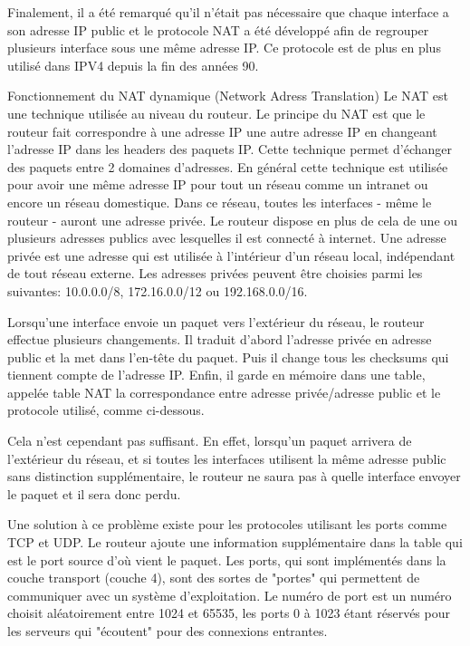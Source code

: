 Finalement, il a été remarqué qu'il n'était pas nécessaire que chaque interface
a son adresse IP public et le protocole NAT a été développé afin de regrouper
plusieurs interface sous une même adresse IP. Ce protocole est de plus en plus
utilisé dans IPV4 depuis la fin des années 90.


Fonctionnement du NAT dynamique (Network Adress Translation)
Le NAT est une technique utilisée au niveau du routeur. Le principe du NAT est
que le routeur fait correspondre à une adresse IP une autre adresse IP en
changeant l'adresse IP dans les headers des paquets IP. Cette technique permet
d'échanger des paquets entre 2 domaines d'adresses. En général cette technique
est utilisée pour avoir une même adresse IP pour tout un réseau comme un 
intranet ou encore un réseau domestique. Dans ce réseau, toutes les interfaces
- même le routeur - auront une adresse privée. Le routeur dispose en plus de
cela de une ou plusieurs adresses publics avec lesquelles il est connecté à
internet. Une adresse privée est une adresse qui est utilisée à l'intérieur
d'un réseau local, indépendant de tout réseau externe. Les adresses privées
peuvent être choisies parmi les suivantes: 10.0.0.0/8, 172.16.0.0/12 ou
192.168.0.0/16.

Lorsqu'une interface envoie un paquet vers l'extérieur du réseau, le routeur
effectue plusieurs changements. Il traduit d'abord l'adresse privée en adresse
public et la met dans l'en-tête du paquet. Puis il change tous les checksums
qui tiennent compte de l'adresse IP. Enfin, il garde en mémoire dans une table,
 appelée table NAT la correspondance entre adresse privée/adresse public et le
protocole utilisé, comme ci-dessous.

Cela n'est cependant pas suffisant. En effet, lorsqu'un paquet arrivera de
l'extérieur du réseau,  et si toutes les interfaces utilisent la même adresse
public sans distinction supplémentaire, le routeur ne saura pas à quelle
interface envoyer le paquet et il sera donc perdu.

Une solution à ce problème existe pour les protocoles utilisant les ports comme
TCP et UDP. Le routeur ajoute une information supplémentaire dans la table qui
est le port source d'où vient le paquet. Les ports, qui sont implémentés dans
la couche transport (couche 4), sont des sortes de "portes" qui permettent de
communiquer avec un système d'exploitation. Le numéro de port est un numéro
choisit aléatoirement entre 1024 et 65535, les ports 0 à 1023 étant réservés
pour les serveurs qui "écoutent" pour des connexions entrantes.

